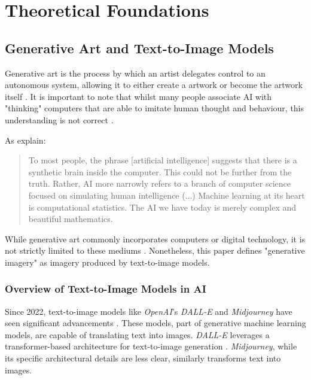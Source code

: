 \section{Theoretical Foundations}
\label{section:theoretical-foundations}

\subsection{Generative Art and Text-to-Image Models}
\label{subsec:generative-art}

Generative art is the process by which an artist delegates control to an autonomous system, allowing it to either create a artwork or become the artwork itself \parencite[112]{Galanter2019}. It is important to note that whilst many people associate AI with "thinking" computers that are able to imitate human thought and behaviour, this understanding is not correct \parencite{Thomas2023}.

As \textcite[673 - 677]{Broussard2019} explain:
\begin{quote}
To most people, the phrase [artificial intelligence] suggests that there is a synthetic brain inside the computer. This could not be further from the truth. Rather, AI more narrowly refers to a branch of computer science focused on simulating human intelligence (...) Machine learning at its heart is computational statistics. The AI we have today is merely complex and beautiful mathematics.
\end{quote}
While generative art commonly incorporates computers or digital technology, it is not strictly limited to these mediums \parencite[5]{Thomas2023}. Nonetheless, this paper defines "generative imagery" as imagery produced by text-to-image models. 

\subsubsection{Overview of Text-to-Image Models in AI}

Since 2022, text-to-image models like \textit{OpenAI}'s \textit{DALL-E} and \textit{Midjourney} have seen significant advancements \parencite{Gozalo2023}. These models, part of generative machine learning models, are capable of translating text into images. \textit{DALL-E} leverages a transformer-based architecture for text-to-image generation \parencite{DataCamp2023}. \textit{Midjourney}, while its specific architectural details are less clear, similarly transforms text into images.


